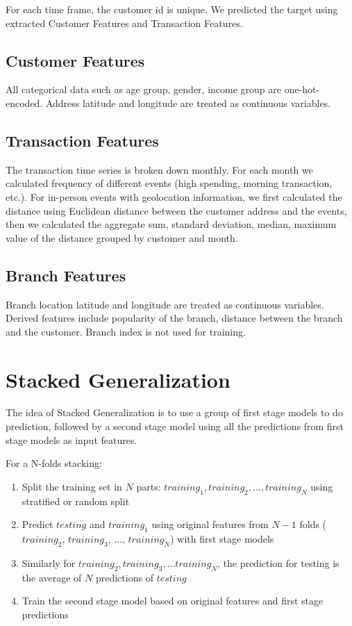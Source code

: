 \documentclass[a4paper]{llncs}
\begin{document}
For each time frame, the customer id is unique. We predicted the target using extracted Customer Features and Transaction Features.

\subsection{Customer Features}
All categorical data such as age group, gender, income group are one-hot-encoded. Address latitude and longitude are treated as continuous variables.

\subsection{Transaction Features}
The transaction time series is broken down monthly. For each month we calculated frequency of different events (high spending, morning transaction, etc.).
 For in-person events with geolocation information, we first calculated the distance using Euclidean distance between the customer address and the events,
 then we calculated the aggregate sum, standard deviation, median, maximum value of the distance grouped by customer and month.

\subsection{Branch Features}
Branch location latitude and longitude are treated as continuous variables. Derived features include popularity of the branch,
 distance between the branch and the customer. Branch index is not used for training.

\section{Stacked Generalization}
The idea of Stacked Generalization \cite{stacking} is to use a group of first stage models to do prediction,
 followed by a second stage model using all the predictions from first stage models as input features.


For a N-folds stacking:

\begin{enumerate}
 \item Split the training set in $N$ parts: $training_1, training_2, ..., training_N$ using stratified or random split

 \item Predict $testing$ and $training_1$ using original features from $N-1$ folds ($training_2$, $training_3$, $...$, $training_N$) with first stage models

 \item Similarly for $training_2, training_3, ... training_N$, the prediction for testing is the average of $N$ predictions of $testing$

 \item Train the second stage model based on original features and first stage predictions
\end{enumerate}
%
\end{document}
